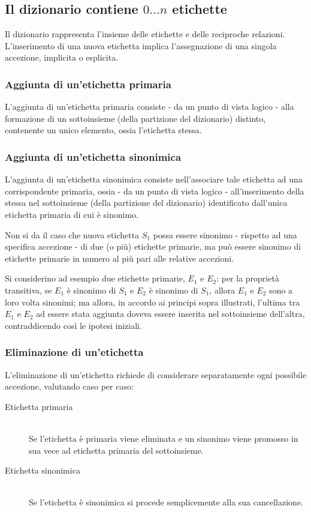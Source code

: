\documentclass[10pt,a4paper,headinclude,footinclude,hidelinks]{scrreprt} %
\begin{document}
	\subsection[Dizionario]{Il dizionario contiene $0...n$ etichette}
	Il dizionario rappresenta l'insieme delle etichette e delle reciproche relazioni. L'inserimento di una nuova etichetta implica l'assegnazione di una singola accezione, implicita o esplicita.

	\subsubsection{Aggiunta di un'etichetta primaria}
	L'aggiunta di un'etichetta primaria consiste - da un punto di vista logico - alla formazione di un sottoinsieme (della partizione del dizionario) distinto, contenente un unico elemento, ossia l'etichetta stessa.
	
	\subsubsection{Aggiunta di un'etichetta sinonimica}
	L'aggiunta di un'etichetta sinonimica consiste nell'associare tale etichetta ad una corrispondente primaria, ossia - da un punto di vista logico - all'inserimento della stessa nel sottoinsieme (della partizione del dizionario) identificato dall'unica etichetta primaria di cui è sinonimo.

	Non si da il caso che nuova etichetta $S_1$ possa essere sinonimo - rispetto ad una specifica accezione - di due (o più) etichette primarie, ma può essere sinonimo di etichette primarie in numero al più pari alle relative accezioni.

	Si considerino ad esempio due etichette primarie, $E_1$ e $E_2$: per la proprietà transitiva, se $E_1$ è sinonimo di $S_1$ e $E_2$ è sinonimo di $S_1$, allora $E_1$ e $E_2$ sono a loro volta sinonimi; ma allora, in accordo ai principi sopra illustrati, l'ultima tra $E_1$ e $E_2$ ad essere stata aggiunta doveva essere inserita nel sottoinsieme dell'altra, contraddicendo così le ipotesi iniziali.

	\subsubsection{Eliminazione di un'etichetta}
	L'eliminazione di un'etichetta richiede di considerare separatamente ogni possibile accezione, valutando caso per caso:
	\begin{description}
	\item[Etichetta primaria] \hfill \\
	Se l'etichetta è primaria viene eliminata e un sinonimo viene promosso in sua vece ad etichetta primaria del sottoinsieme.
 	\item[Etichetta sinonimica] \hfill \\
	Se l'etichetta è sinonimica si procede semplicemente alla sua cancellazione.
	\end{description}
\end{document}

